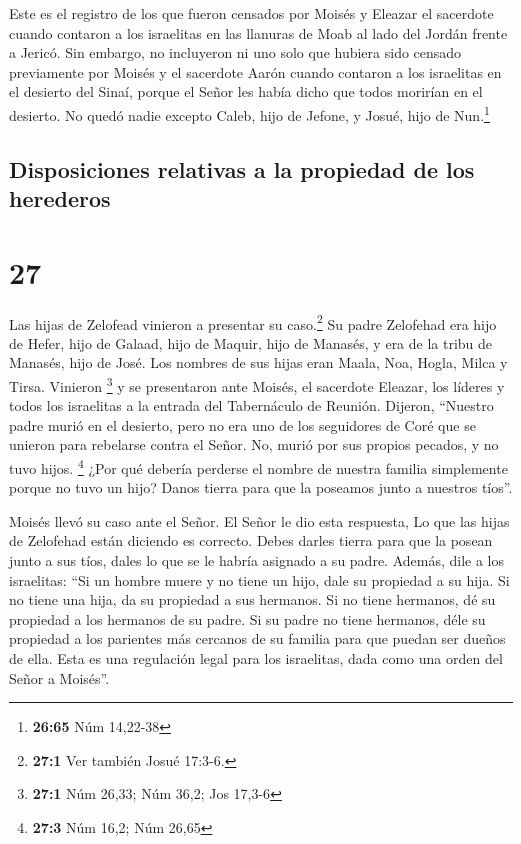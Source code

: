  Este es el registro de los que fueron censados por
Moisés y Eleazar el sacerdote cuando contaron a los israelitas en las
llanuras de Moab al lado del Jordán frente a Jericó.  Sin
embargo, no incluyeron ni uno solo que hubiera sido censado previamente
por Moisés y el sacerdote Aarón cuando contaron a los israelitas en el
desierto del Sinaí,  porque el Señor les había dicho que
todos morirían en el desierto. No quedó nadie excepto Caleb, hijo de
Jefone, y Josué, hijo de Nun.\footnote{\textbf{26:65} Núm 14,22-38}

\hypertarget{disposiciones-relativas-a-la-propiedad-de-los-herederos}{%
\subsection{Disposiciones relativas a la propiedad de los
herederos}\label{disposiciones-relativas-a-la-propiedad-de-los-herederos}}

\hypertarget{section-26}{%
\section{27}\label{section-26}}

 Las hijas de Zelofead vinieron a presentar su
caso.\footnote{\textbf{27:1} Ver también Josué 17:3-6.} Su padre
Zelofehad era hijo de Hefer, hijo de Galaad, hijo de Maquir, hijo de
Manasés, y era de la tribu de Manasés, hijo de José. Los nombres de sus
hijas eran Maala, Noa, Hogla, Milca y Tirsa. Vinieron \footnote{\textbf{27:1}
  Núm 26,33; Núm 36,2; Jos 17,3-6}  y se presentaron ante
Moisés, el sacerdote Eleazar, los líderes y todos los israelitas a la
entrada del Tabernáculo de Reunión. Dijeron,  ``Nuestro
padre murió en el desierto, pero no era uno de los seguidores de Coré
que se unieron para rebelarse contra el Señor. No, murió por sus propios
pecados, y no tuvo hijos. \footnote{\textbf{27:3} Núm 16,2; Núm 26,65}
 ¿Por qué debería perderse el nombre de nuestra familia
simplemente porque no tuvo un hijo? Danos tierra para que la poseamos
junto a nuestros tíos''.

 Moisés llevó su caso ante el Señor.  El
Señor le dio esta respuesta,  Lo que las hijas de
Zelofehad están diciendo es correcto. Debes darles tierra para que la
posean junto a sus tíos, dales lo que se le habría asignado a su padre.
 Además, dile a los israelitas: ``Si un hombre muere y no
tiene un hijo, dale su propiedad a su hija.  Si no tiene
una hija, da su propiedad a sus hermanos.  Si no tiene
hermanos, dé su propiedad a los hermanos de su padre.  Si
su padre no tiene hermanos, déle su propiedad a los parientes más
cercanos de su familia para que puedan ser dueños de ella. Esta es una
regulación legal para los israelitas, dada como una orden del Señor a
Moisés''.

